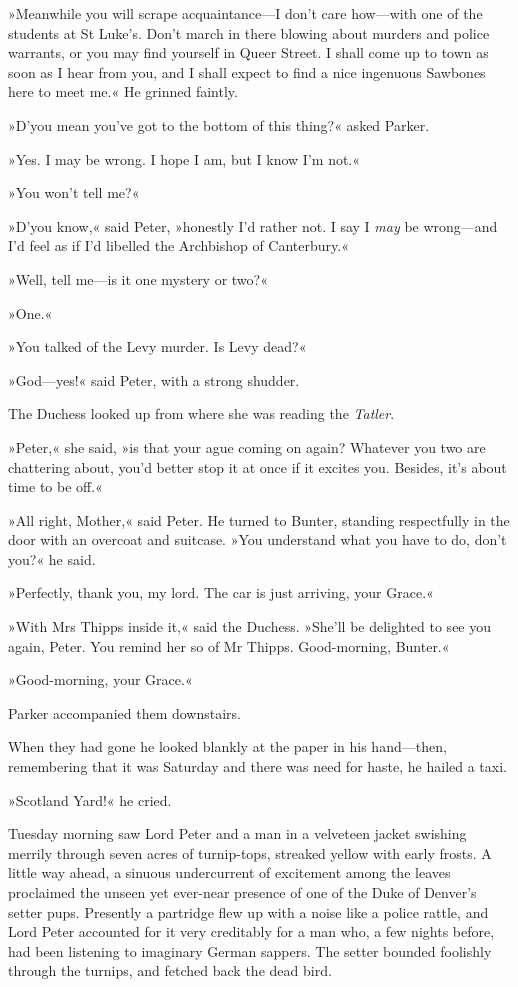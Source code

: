»Meanwhile you will scrape acquaintance—I don't care how—with one of the students at St Luke's. Don't march in there blowing about murders and police warrants, or you may find yourself in Queer Street. I shall come up to town as soon as I hear from you, and I shall expect to find a nice ingenuous Sawbones here to meet me.« He grinned faintly.

»D'you mean you've got to the bottom of this thing?« asked Parker.

»Yes. I may be wrong. I hope I am, but I know I'm not.«

»You won't tell me?«

»D'you know,« said Peter, »honestly I'd rather not. I say I \textit{may} be wrong—and I'd feel as if I'd libelled the Archbishop of Canterbury.«

»Well, tell me—is it one mystery or two?«

»One.«

»You talked of the Levy murder. Is Levy dead?«

»God—yes!« said Peter, with a strong shudder.

The Duchess looked up from where she was reading the \textit{Tatler}.

»Peter,« she said, »is that your ague coming on again? Whatever you two are chattering about, you'd better stop it at once if it excites you. Besides, it's about time to be off.«

»All right, Mother,« said Peter. He turned to Bunter, standing respectfully in the door with an overcoat and suitcase. »You understand what you have to do, don't you?« he said.

»Perfectly, thank you, my lord. The car is just arriving, your Grace.«

»With Mrs Thipps inside it,« said the Duchess. »She'll be delighted to see you again, Peter. You remind her so of Mr Thipps. Good-morning, Bunter.«

»Good-morning, your Grace.«

Parker accompanied them downstairs.

When they had gone he looked blankly at the paper in his hand—then, remembering that it was Saturday and there was need for haste, he hailed a taxi.

»Scotland Yard!« he cried.

Tuesday morning saw Lord Peter and a man in a velveteen jacket swishing merrily through seven acres of turnip-tops, streaked yellow with early frosts. A little way ahead, a sinuous undercurrent of excitement among the leaves proclaimed the unseen yet ever-near presence of one of the Duke of Denver's setter pups. Presently a partridge flew up with a noise like a police rattle, and Lord Peter accounted for it very creditably for a man who, a few nights before, had been listening to imaginary German sappers. The setter bounded foolishly through the turnips, and fetched back the dead bird.

